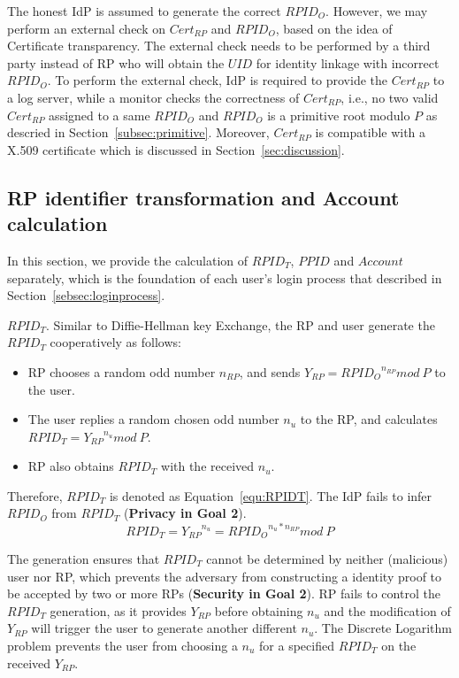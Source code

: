 The honest IdP is assumed to generate the correct $RPID_O$. However, we may perform an external check on $Cert_{RP}$ and $RPID_O$, based on the idea of Certificate transparency. The external check needs to be performed by a third party instead of RP who will obtain the $UID$ for identity linkage with incorrect $RPID_O$. To perform the external check, IdP is required to provide the $Cert_{RP}$ to a log server, while a monitor checks the correctness of $Cert_{RP}$, i.e., no two valid $Cert_{RP}$ assigned to a same $RPID_O$ and $RPID_O$ is a primitive root modulo $P$ as descried in Section~\ref{subsec:primitive}. Moreover, $Cert_{RP}$ is compatible with a X.509 certificate which is discussed in Section~\ref{sec:discussion}.

\subsection{RP identifier transformation and Account calculation}
\label{subsec:identifier-generation}
In this section, we provide the calculation of $RPID_T$, $PPID$ and $Account$ separately, which is the foundation of each user's login process that described in Section~\ref{sebsec:loginprocess}.

{$RPID_T$}. Similar to Diffie-Hellman key Exchange\cite{DiffieH76}, the RP and user generate the  $RPID_T$ cooperatively as follows:
\begin{itemize}
  \item RP chooses a random odd number $n_{RP}$, and sends $Y_{RP} = {RPID_O}^{n_{RP}} mod \ P$ to the user.
  \item The user replies a random chosen odd number $n_{u}$ to the RP, and calculates $RPID_T = {Y_{RP}}^{n_{u}} mod \ P$.
  \item RP also obtains $RPID_T$ with the received $n_{u}$.
\end{itemize}

Therefore, $RPID_T$ is denoted as Equation~\ref{equ:RPIDT}. The IdP fails to infer ${RPID_O}$ from $RPID_T$ (\textbf{Privacy in Goal 2}).
   \begin{equation}
   RPID_T = {Y_{RP}}^{n_{u}} = {RPID_O}^{n_{u}* n_{RP}} mod \ P
   \label{equ:RPIDT}
   \end{equation}

The generation ensures that $RPID_T$ cannot be determined by neither (malicious) user nor RP, which prevents the adversary from constructing a identity proof to be accepted by two or more RPs (\textbf{Security in Goal 2}). RP fails to control the $RPID_T$ generation, as it provides $Y_{RP}$ before obtaining $n_{u}$ and the modification of $Y_{RP}$ will trigger the user to generate another different  $n_{u}$. The Discrete Logarithm problem prevents the user from choosing a $n_{u}$ for a specified $RPID_T$ on the received $Y_{RP}$.

